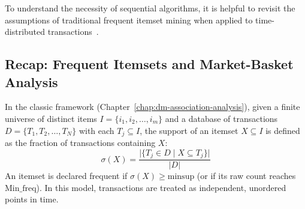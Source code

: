 To understand the necessity of sequential algorithms, it is helpful to revisit the assumptions of traditional frequent itemset mining when applied to time-distributed transactions~\cite{tan2018}.

\subsection{Recap: Frequent Itemsets and Market-Basket Analysis}
In the classic framework (Chapter~\ref{chap:dm-association-analysis}), given a finite universe of distinct items $I = \{i_1, i_2, \dots, i_m\}$ and a database of transactions $D = \{T_1, T_2, \dots, T_N\}$ with each $T_j \subseteq I$, the support of an itemset $X \subseteq I$ is defined as the fraction of transactions containing $X$:
\begin{equation}
\label{eq:seq-recall-support-en}
\sigma(X) = \frac{\big| \{ T_j \in D \mid X \subseteq T_j \} \big|}{|D|}
\end{equation}
An itemset is declared frequent if $\sigma(X) \ge \text{minsup}$ (or if its raw count reaches $\text{Min\_freq}$). In this model, transactions are treated as independent, unordered points in time.


